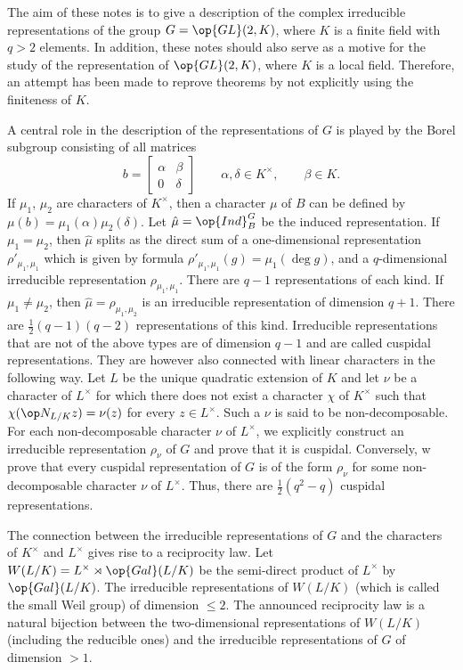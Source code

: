 \documentclass[../main.tex]{subfiles}
\begin{document}
The aim of these notes is to give a description of the complex irreducible representations of the group $G=\op{GL}(2,K)$, where $K$ is a finite field with $q>2$ elements. In addition, these notes should also serve as a motive for the study of the representation of $\op{GL}(2,K)$, where $K$ is a local field. Therefore, an attempt has been made to reprove theorems by not explicitly using the finiteness of $K$.

A central role in the description of the representations of $G$ is played by the Borel subgroup consisting of all matrices
\[b=\begin{bmatrix}
	\alpha & \beta \\
	0 & \delta
\end{bmatrix}\qquad\alpha,\delta\in K^\times,\qquad\beta\in K.\]
If $\mu_1$, $\mu_2$ are characters of $K^\times$, then a character $\mu$ of $B$ can be defined by $\mu(b)=\mu_1(\alpha)\mu_2(\delta)$. Let $\hat\mu=\op{Ind}^G_B$ be the induced representation. If $\mu_1=\mu_2$, then $\hat\mu$ splits as the direct sum of a one-dimensional representation $\rho'_{\mu_1,\mu_1}$ which is given by formula $\rho'_{\mu_1,\mu_1}(g)=\mu_1(\deg g)$, and a $q$-dimensional irreducible representation $\rho_{\mu_1,\mu_1}$. There are $q-1$ representations of each kind. If $\mu_1\ne\mu_2$, then $\hat\mu=\rho_{\mu_1,\mu_2}$ is an irreducible representation of dimension $q+1$. There are $\frac12(q-1)(q-2)$ representations of this kind. Irreducible representations that are not of the above types are of dimension $q-1$ and are called cuspidal representations. They are however also connected with linear characters in the following way. Let $L$ be the unique quadratic extension of $K$ and let $\nu$ be a character of $L^\times$ for which there does not exist a character $\chi$ of $K^\times$ such that $\chi(\op N_{L/K}z)=\nu(z)$ for every $z\in L^\times$. Such a $\nu$ is said to be non-decomposable. For each non-decomposable character $\nu$ of $L^\times$, we explicitly construct an irreducible representation $\rho_\nu$ of $G$ and prove that it is cuspidal. Conversely, w prove that every cuspidal representation of $G$ is of the form $\rho_\nu$ for some non-decomposable character $\nu$ of $L^\times$. Thus, there are $\frac12\left(q^2-q\right)$ cuspidal representations.

The connection between the irreducible representations of $G$ and the characters of $K^\times$ and $L^\times$ gives rise to a reciprocity law. Let $W(L/K)=L^\times\rtimes\op{Gal}(L/K)$ be the semi-direct product of $L^\times$ by $\op{Gal}(L/K)$. The irreducible representations of $W(L/K)$ (which is called the small Weil group) of dimension $\le2$. The announced reciprocity law is a natural bijection between the two-dimensional representations of $W(L/K)$ (including the reducible ones) and the irreducible representations of $G$ of dimension $>1$.
\end{document}
